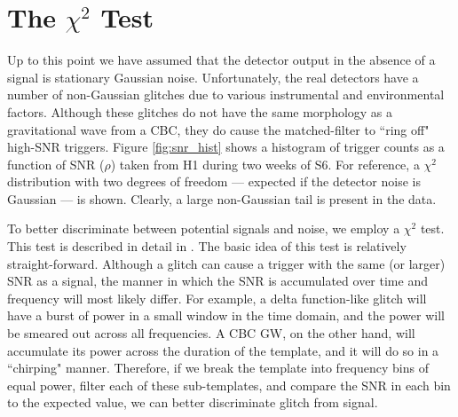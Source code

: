 \section{The $\chi^2$ Test}
\label{sec:chisq}

Up to this point we have assumed that the detector output in the absence of a signal is stationary Gaussian noise. Unfortunately, the real detectors have a number of non-Gaussian glitches due to various instrumental and environmental factors. %
Although these glitches do not have the same morphology as a gravitational wave from a \ac{CBC}, they do cause the matched-filter to ``ring off" high-\ac{SNR} triggers. Figure \ref{fig:snr_hist} shows a histogram of trigger counts as a function of \ac{SNR} ($\rho$) taken from H1 during two weeks of \ac{S6}. For reference, a $\chi^2$ distribution with two degrees of freedom --- expected if the detector noise is Gaussian --- is shown. Clearly, a large non-Gaussian tail is present in the data.

To better discriminate between potential signals and noise, we employ a $\chi^2$ test. This test is described in detail in \cite{Allen:2004}. The basic idea of this test is relatively straight-forward. Although a glitch can cause a trigger with the same (or larger) \ac{SNR} as a signal, the manner in which the \ac{SNR} is accumulated over time and frequency will most likely differ. For example, a delta function-like glitch will have a burst of power in a small window in the time domain, and the power will be smeared out across all frequencies. A \ac{CBC} \ac{GW}, on the other hand, will accumulate its power across the duration of the template, and it will do so in a ``chirping" manner. Therefore, if we break the template into frequency bins of equal power, filter each of these sub-templates, and compare the \ac{SNR} in each bin to the expected value, we can better discriminate glitch from signal.

